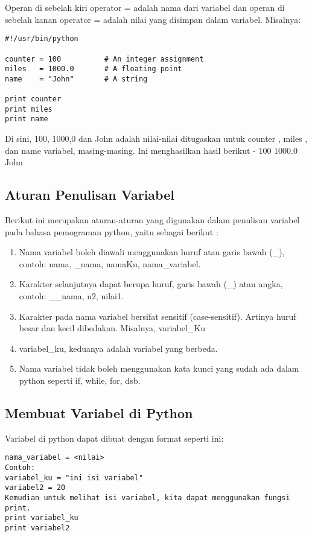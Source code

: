 Operan di sebelah kiri operator = adalah nama dari variabel dan operan di sebelah kanan operator = adalah nilai yang disimpan dalam variabel. Misalnya:

\begin{verbatim}
#!/usr/bin/python

counter = 100          # An integer assignment
miles   = 1000.0       # A floating point
name    = "John"       # A string

print counter
print miles
print name
\end{verbatim}

Di sini, 100, 1000,0 dan John adalah nilai-nilai ditugaskan untuk counter , miles , dan name variabel, masing-masing. Ini menghasilkan hasil berikut -
100
1000.0
John

\subsection{Aturan Penulisan Variabel}
Berikut ini merupakan aturan-aturan yang digunakan dalam penulisan variabel pada bahasa pemograman python, yaitu sebagai berikut :
\begin{enumerate}
	\item Nama variabel boleh diawali menggunakan huruf atau garis bawah (_), contoh: nama, _nama, namaKu, nama_variabel.
	\item Karakter selanjutnya dapat berupa huruf, garis bawah (_) atau angka, contoh: __nama, n2, nilai1.
	\item Karakter pada nama variabel bersifat sensitif (case-sensitif). Artinya huruf besar dan kecil dibedakan. Misalnya, variabel_Ku
	\item variabel_ku, keduanya adalah variabel yang berbeda.
	\item Nama variabel tidak boleh menggunakan kata kunci yang sudah ada dalam python seperti if, while, for, dsb.
\end{enumerate}  

\subsection{Membuat Variabel di Python}
Variabel di python dapat dibuat dengan format seperti ini:

\begin{verbatim}
nama_variabel = <nilai>
Contoh:
variabel_ku = "ini isi variabel"
variabel2 = 20
Kemudian untuk melihat isi variabel, kita dapat menggunakan fungsi print.
print variabel_ku
print variabel2
\end{verbatim}


